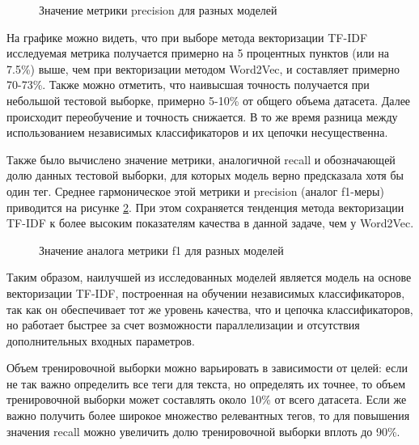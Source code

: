 \documentclass[a4paper, 12pt]{article}
\begin{document}
\begin{large}
\begin{figure}[h!]
    \captionsetup{justification=centering}
    \caption{Значение метрики precision для разных моделей}
    \label{precision}
\end{figure}

На графике можно видеть, что при выборе метода векторизации TF-IDF исследуемая метрика получается примерно на 5 процентных пунктов (или на 7.5\%) выше, чем при векторизации методом Word2Vec, и составляет примерно 70-73\%.
Также можно отметить, что наивысшая точность получается при небольшой тестовой выборке, примерно 5-10\% от общего объема датасета.
Далее происходит переобучение и точность снижается.
В то же время разница между использованием независимых классификаторов и их цепочки несущественна.

Также было вычислено значение метрики, аналогичной recall и обозначающей долю данных тестовой выборки, для которых модель верно предсказала хотя бы один тег.
Среднее гармоническое этой метрики и precision (аналог f1-меры) приводится на рисунке \ref{f1}.
При этом сохраняется тенденция метода векторизации TF-IDF к более высоким показателям качества в данной задаче, чем у Word2Vec.

\begin{figure}[h!]
    \captionsetup{justification=centering}
    \caption{Значение аналога метрики f1 для разных моделей}
    \label{f1}
\end{figure}

Таким образом, наилучшей из исследованных моделей является модель на основе векторизации TF-IDF, построенная на обучении независимых классификаторов, так как он обеспечивает тот же уровень качества, что и цепочка классификаторов, но работает быстрее за счет возможности параллелизации и отсутствия дополнительных входных параметров.

Объем тренировочной выборки можно варьировать в зависимости от целей: если не так важно определить все теги для текста, но определять их точнее, то объем тренировочной выборки может составлять около 10\% от всего датасета.
Если же важно получить более широкое множество релевантных тегов, то для повышения значения recall можно увеличить долю тренировочной выборки вплоть до 90\%.


\end{large}
\end{document}
